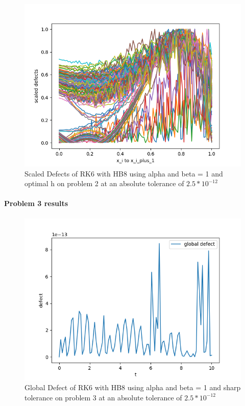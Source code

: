 \documentclass{article}
\begin{document}
\begin{figure}[H]
\centering
\includegraphics[width=0.7\linewidth]{./figures/sharp_tolerance_rk6_with_hb8_p2_scaled_defects}
\caption{Scaled Defects of RK6 with HB8 using alpha and beta = 1 and optimal h on problem 2 at an absolute tolerance of $2.5*10^{-12}$}
\label{fig:sharp_tolerance_rk6_with_hb8_p2_scaled_defects}
\end{figure}

\paragraph{Problem 3 results}


\begin{figure}[H]
\centering
\includegraphics[width=0.7\linewidth]{./figures/sharp_tolerance_rk4_with_hb6_p3_global_defect}
\caption{Global Defect of RK6 with HB8 using alpha and beta = 1 and sharp tolerance on problem 3 at an absolute tolerance of $2.5*10^{-12}$}
\label{fig:sharp_tolerance_rk6_with_hb8_p3_global_defect}
\end{figure}
\end{document}
